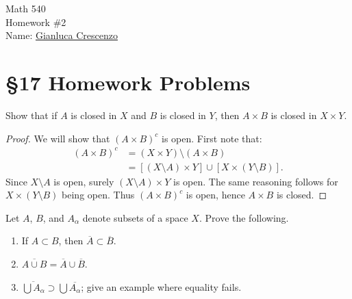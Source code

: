 \documentclass[12pt,twoside,openany]{memoir}
\begin{document}
\begin{center}
    {\Large Math 540 \\[0.1in]Homework \#2}\\[.175in]
    {Name:} {\underline{Gianluca Crescenzo\hspace*{2in}}}\\[0.15in]
    \end{center}
    \vspace{4pt}
\section*{\S 17 Homework Problems}
\begin{exercise}[manual-num={3}]
    Show that if $A$ is closed in $X$ and $B$ is closed in $Y$, then $A \times B$ is closed in $X \times Y$.
\end{exercise}
    \begin{proof}
        We will show that $(A \times B)^c$ is open. First note that:
            \begin{equation*}
            \begin{split}
                (A \times B)^c
                & = (X \times Y) \setminus (A \times B) \\
                & = \left[(X\setminus A) \times Y\right] \cup \left[ X \times (Y \setminus B) \right].
            \end{split}
            \end{equation*}
        Since $X \setminus A$ is open, surely $(X \setminus A) \times Y$ is open. The same reasoning follows for $X \times (Y \setminus B)$ being open. Thus $(A \times B)^c$ is open, hence $A \times B$ is closed.
    \end{proof}
\begin{exercise}[manual-num={6}]
    Let $A$, $B$, and $A_\alpha$ denote subsets of a space $X$. Prove the following.
        \begin{enumerate}[label = (\alph*),itemsep=1pt,topsep=3pt]
            \item If $A \subset B$, then $\overline{A} \subset \overline{B}$.
            \item $\overline{A \cup B} = \overline{A} \cup \overline{B}$.
            \item $\overline{ \bigcup A_\alpha} \supset \bigcup \overline{A_\alpha}$; give an example where equality fails.
        \end{enumerate}
\end{exercise}
\end{document}
